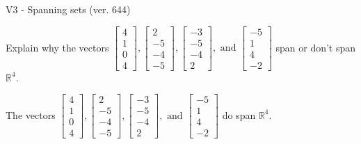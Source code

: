 \begin{exercise}
  \begin{exerciseTitle}V3 - Spanning sets (ver. 644)\end{exerciseTitle}
  \begin{exerciseStatement}
    Explain why the vectors \(\left[\begin{array}{r}
4 \\
1 \\
0 \\
4
\end{array}\right] , \left[\begin{array}{r}
2 \\
-5 \\
-4 \\
-5
\end{array}\right] , \left[\begin{array}{r}
-3 \\
-5 \\
-4 \\
2
\end{array}\right] , \text{ and } \left[\begin{array}{r}
-5 \\
1 \\
4 \\
-2
\end{array}\right]\) span or don't span \(\mathbb{R}^4\). 
	


  \end{exerciseStatement}
  \begin{exerciseAnswer}
   The vectors \(\left[\begin{array}{r}
4 \\
1 \\
0 \\
4
\end{array}\right] , \left[\begin{array}{r}
2 \\
-5 \\
-4 \\
-5
\end{array}\right] , \left[\begin{array}{r}
-3 \\
-5 \\
-4 \\
2
\end{array}\right] , \text{ and } \left[\begin{array}{r}
-5 \\
1 \\
4 \\
-2
\end{array}\right]\) 
  	 do  
	span \(\mathbb{R}^4\).
  


  \end{exerciseAnswer}
\end{exercise}